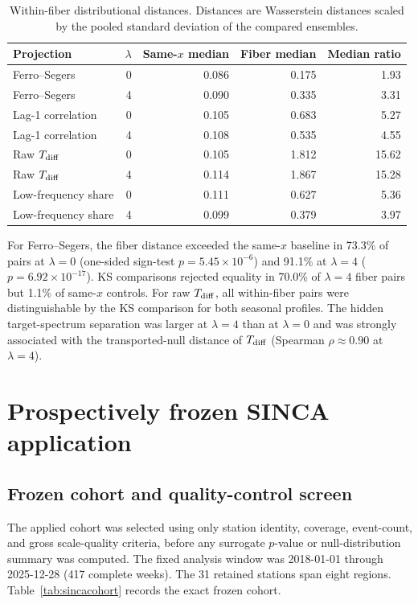 \documentclass[11pt]{article}
\begin{document}
\begin{table}[ht]
\centering
\caption{Within-fiber distributional distances. Distances are Wasserstein distances scaled by the pooled standard deviation of the compared ensembles.}\label{tab:fiber}
\begin{tabular}{lrrrr}
\toprule
Projection & $\lambda$ & Same-$x$ median & Fiber median & Median ratio\\
\midrule
Ferro--Segers & 0 & 0.086 & 0.175 & 1.93\\
Ferro--Segers & 4 & 0.090 & 0.335 & 3.31\\
Lag-1 correlation & 0 & 0.105 & 0.683 & 5.27\\
Lag-1 correlation & 4 & 0.108 & 0.535 & 4.55\\
Raw $T_{\rm diff}$ & 0 & 0.105 & 1.812 & 15.62\\
Raw $T_{\rm diff}$ & 4 & 0.114 & 1.867 & 15.28\\
Low-frequency share & 0 & 0.111 & 0.627 & 5.36\\
Low-frequency share & 4 & 0.099 & 0.379 & 3.97\\
\bottomrule
\end{tabular}
\end{table}

For Ferro--Segers, the fiber distance exceeded the same-$x$ baseline in 73.3\% of pairs at $\lambda=0$ (one-sided sign-test $p=5.45\times10^{-6}$) and 91.1\% at $\lambda=4$ ($p=6.92\times10^{-17}$). KS comparisons rejected equality in 70.0\% of $\lambda=4$ fiber pairs but 1.1\% of same-$x$ controls. For raw $T_{\rm diff}$, all within-fiber pairs were distinguishable by the KS comparison for both seasonal profiles. The hidden target-spectrum separation was larger at $\lambda=4$ than at $\lambda=0$ and was strongly associated with the transported-null distance of $T_{\rm diff}$ (Spearman $\rho\approx0.90$ at $\lambda=4$).


\section{Prospectively frozen SINCA application}
\subsection{Frozen cohort and quality-control screen}
The applied cohort was selected using only station identity, coverage, event-count, and gross scale-quality criteria, before any surrogate $p$-value or null-distribution summary was computed. The fixed analysis window was 2018-01-01 through 2025-12-28 (417 complete weeks). The 31 retained stations span eight regions. Table~\ref{tab:sincacohort} records the exact frozen cohort.
\end{document}
